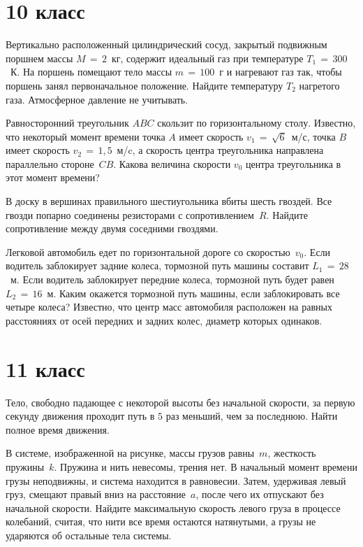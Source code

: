 \section{10 класс}

\AddProb Вертикально расположенный цилиндрический сосуд, закрытый подвижным поршнем массы $M\,=\,2$~кг, содержит идеальный газ при температуре 
$T_1\,=\,300$~К. На поршень помещают тело массы $m\,=\,100$~г и нагревают газ так, чтобы поршень занял первоначальное положение. 
Найдите температуру $T_2$ нагретого газа. Атмосферное давление не учитывать.

\AddProb Равносторонний треугольник $ABC$ скользит по горизонтальному столу. Известно, что некоторый момент времени точка $A$ имеет скорость 
$v_1\,=\,\sqrt{6}$~м/с, точка $B$ имеет скорость $v_2\,=\,1,5$~м/c, а скорость центра треугольника направлена параллельно стороне~$CB$. 
Какова величина скорости $v_0$ центра треугольника в этот момент времени? 

\AddProb В доску в вершинах правильного шестиугольника вбиты шесть гвоздей. Все гвозди попарно соединены резисторами с сопротивлением~$R$. 
Найдите сопротивление между двумя соседними гвоздями.

\AddProb Легковой автомобиль едет по горизонтальной дороге со скоростью~$v_0$. Если водитель заблокирует задние колеса, 
тормозной путь машины составит $L_1\,=\,28$~м. Если водитель заблокирует передние колеса, тормозной путь будет равен $L_2\,=\,16$~м. 
Каким окажется тормозной путь машины, если заблокировать все четыре колеса? Известно, что центр масс автомобиля расположен на равных расстояниях 
от осей передних и задних колес, диаметр которых одинаков.



\section{11 класс}

\AddProb Тело, свободно падающее с некоторой высоты без начальной скорости, за первую секунду движения проходит путь в $5$ раз меньший, чем за последнюю. 
Найти полное время движения.

\AddProb В системе, изображенной на рисунке, массы грузов равны~$m$, жесткость пружины~$k$. Пружина и нить невесомы, трения нет. 
В начальный момент времени грузы неподвижны, и система находится в равновесии. Затем, удерживая левый груз, смещают правый вниз на расстояние~$a$, 
после чего их отпускают без начальной скорости. Найдите максимальную скорость левого груза в процессе колебаний, 
считая, что нити все время остаются натянутыми, а грузы не ударяются об остальные тела системы.

